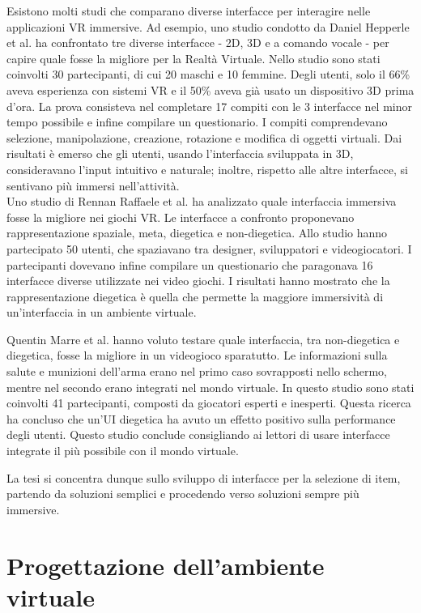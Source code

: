 \documentclass[target=bach,aauheader=]{thud}
\begin{document}
Esistono molti studi che comparano diverse interfacce per interagire nelle applicazioni VR immersive.
Ad esempio, uno studio condotto da Daniel Hepperle et al.\cite{Hepperle} ha confrontato tre diverse interfacce - 2D, 3D e a comando vocale - per capire quale fosse la migliore per la Realtà Virtuale.  
Nello studio sono stati coinvolti 30 partecipanti, di cui 20 maschi e 10 femmine.
Degli utenti, solo il 66\% aveva esperienza con sistemi VR e il 50\% aveva già usato un dispositivo 3D prima d'ora.
La prova consisteva nel completare 17 compiti con le 3 interfacce nel minor tempo possibile e infine compilare un questionario.
I compiti comprendevano selezione, manipolazione, creazione, rotazione e modifica di oggetti virtuali.
Dai risultati è emerso che gli utenti, usando l'interfaccia sviluppata in 3D, consideravano l'input intuitivo e naturale; inoltre, rispetto alle altre interfacce, si sentivano più immersi nell'attività. \\

Uno studio di Rennan Raffaele et al.\cite{Raffaele} ha analizzato quale interfaccia immersiva fosse la migliore nei giochi VR.
Le interfacce a confronto proponevano rappresentazione spaziale, meta, diegetica e non-diegetica.
Allo studio hanno partecipato 50 utenti, che spaziavano tra designer, sviluppatori e videogiocatori.
I partecipanti dovevano infine compilare un questionario che paragonava 16 interfacce diverse utilizzate nei video giochi.
I risultati hanno mostrato che la rappresentazione diegetica è quella che permette la maggiore immersività di un'interfaccia in un ambiente virtuale.

Quentin Marre et al. \cite{Marre} hanno voluto testare quale interfaccia, tra non-diegetica e diegetica, fosse la migliore in un videogioco sparatutto.
Le informazioni sulla salute e munizioni dell'arma erano nel primo caso sovrapposti nello schermo, mentre nel secondo erano integrati nel mondo virtuale.
In questo studio sono stati coinvolti 41 partecipanti, composti da giocatori esperti e inesperti. 
Questa ricerca ha concluso che un'UI diegetica ha avuto un effetto positivo sulla performance degli utenti.
Questo studio conclude consigliando ai lettori di usare interfacce integrate il più possibile con il mondo virtuale.

La tesi si concentra dunque sullo sviluppo di interfacce per la selezione di item, partendo da soluzioni semplici e procedendo verso soluzioni sempre più immersive. 

\chapter{Progettazione dell'ambiente virtuale} %
\end{document}
